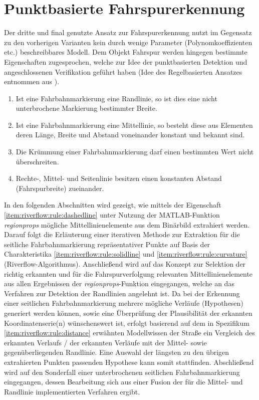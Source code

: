 \chapter{Punktbasierte Fahrspurerkennung \dcsecondauthorshort} 
\label{sec:fahrspurerkennung:riverflow}

Der dritte und final genutzte Ansatz zur Fahrspurerkennung nutzt im Gegensatz zu den vorherigen Varianten kein durch wenige Parameter (Polynomkoeffizienten etc.) beschreibbares Modell. Dem Objekt Fahrspur werden hingegen bestimmte Eigenschaften zugesprochen, welche zur Idee der punktbasierten Detektion und angeschlossenen Verifikation geführt haben (Idee des Regelbasierten Ansatzes entnommen aus \autocite[35-39]{drauschkeEchtzeitfaehigeStartpunktalgorithmenFuer2016}).
\begin{enumerate}
\item \label{item:riverflow:rule:solidline}
Ist eine Fahrbahnmarkierung eine Randlinie, so ist dies eine nicht unterbrochene Markierung bestimmter Breite.
\item \label{item:riverflow:rule:dashedline}
Ist eine Fahrbahnmarkierung eine Mittellinie, so besteht diese aus Elementen deren Länge, Breite und Abstand voneinander konstant und bekannt sind.
\item \label{item:riverflow:rule:curvature}
Die Krümmung einer Fahrbahnmarkierung darf einen bestimmten Wert nicht überschreiten.
\item \label{item:riverflow:rule:distance}
Rechte-, Mittel- und Seitenlinie besitzen einen konstanten Abstand (Fahrspurbreite) zueinander.
\end{enumerate}
In den folgenden Abschnitten wird gezeigt, wie mittels der Eigenschaft \ref{item:riverflow:rule:dashedline} unter Nutzung der MATLAB-Funktion \emph{regionprops} mögliche Mittellinienelemente aus dem Binärbild extrahiert werden. Darauf folgt die Erläuterung einer iterativen Methode zur Extraktion für die seitliche Fahrbahnmarkierung repräsentativer Punkte auf Basis der Charakteristika \ref{item:riverflow:rule:solidline} und \ref{item:riverflow:rule:curvature} (\glqq Riverflow-Algorithmus\grqq ). Anschließend wird auf das Konzept zur Selektion der richtig erkannten und für die Fahrspurverfolgung relevanten Mittellinienelemente aus allen Ergebnissen der \emph{regionprops}-Funktion eingegangen, welche an das Verfahren zur Detektion der Randlinien angelehnt ist. Da bei der Erkennung einer seitlichen Fahrbahnmarkierung mehrere mögliche Verläufe (\glqq Hypothesen\grqq ) generiert werden können, sowie eine Überprüfung der Plausibilität der erkannten Koordinatenserie(n) wünschenswert ist, erfolgt basierend auf dem in Spezifikum \ref{item:riverflow:rule:distance} erwähnten Modellwissen der Straße ein Vergleich des erkannten Verlaufs / der erkannten Verläufe mit der Mittel- sowie gegenüberliegenden Randlinie. Eine Auswahl der längsten zu den übrigen extrahierten Punkten passenden Hypothese kann somit stattfinden. Abschließend wird auf den Sonderfall einer unterbrochenen seitlichen Fahrbahnmarkierung eingegangen, dessen Bearbeitung sich aus einer Fusion der für die Mittel- und Randlinie implementierten Verfahren ergibt.




